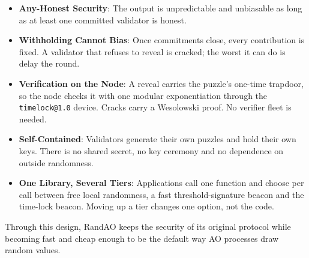 \begin{itemize}
    \item \textbf{Any-Honest Security}: The output is unpredictable and unbiasable as long as at least one committed validator is honest.

    \item \textbf{Withholding Cannot Bias}: Once commitments close, every contribution is fixed. A validator that refuses to reveal is cracked; the worst it can do is delay the round.

    \item \textbf{Verification on the Node}: A reveal carries the puzzle's one-time trapdoor, so the node checks it with one modular exponentiation through the \texttt{timelock@1.0} device. Cracks carry a Wesolowski proof. No verifier fleet is needed.

    \item \textbf{Self-Contained}: Validators generate their own puzzles and hold their own keys. There is no shared secret, no key ceremony and no dependence on outside randomness.

    \item \textbf{One Library, Several Tiers}: Applications call one function and choose per call between free local randomness, a fast threshold-signature beacon and the time-lock beacon. Moving up a tier changes one option, not the code.
\end{itemize}

Through this design, RandAO keeps the security of its original protocol while becoming fast and cheap enough to be the default way AO processes draw random values.
